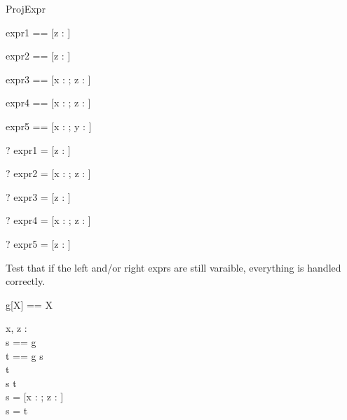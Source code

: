 \begin{zsection}
  \SECTION ProjExpr
\end{zsection}

\begin{zed} expr1 == [z : \nat] \project [z : \nat] \end{zed}
\begin{zed} expr2 == [z : \nat]  \end{zed}
\begin{zed} expr3 == [x : \nat; z : \nat] \project [z : \nat] \end{zed}
\begin{zed} expr4 == [x : \nat; z : \nat]  \end{zed}
\begin{zed} expr5 == [x : \nat; y : \nat] \project [z : \nat] \end{zed}

\begin{zed} \vdash? expr1 = [z : \nat] \end{zed}
\begin{zed} \vdash? expr2 = [x : \nat; z : \nat] \end{zed}
\begin{zed} \vdash? expr3 = [z : \nat] \end{zed}
\begin{zed} \vdash? expr4 = [x : \nat; z : \nat] \end{zed}
\begin{zed} \vdash? expr5 = [z : \nat] \end{zed}

Test that if the left and/or right exprs are still varaible, everything 
is handled correctly.
\begin{zed}
  g[X] == X
\end{zed}

\begin{axdef}
  x, z : \nat\\
  s == g\\
  t == g
\where
  s \project [x : \nat]\\
  [z : \nat] \project t\\
  s \project t\\
  s = [x : \nat; z : \nat]\\
  s = t
\end{axdef}
